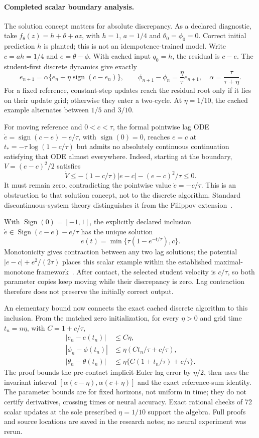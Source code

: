 \documentclass[11pt,a4paper]{article}
\begin{document}
\paragraph{Completed scalar boundary analysis.}
The solution concept matters for absolute discrepancy. As a declared
diagnostic, take $f_\theta(z)=h+\theta+az$, with $h=1$, $a=1/4$ and
$\theta_0=\phi_0=0$. Correct initial prediction $h$ is planted; this
is not an idempotence-trained model. Write $c=ah=1/4$ and
$e=\theta-\phi$. With cached input $q_0=h$, the residual is $c-e$.
The student-first discrete dynamics give exactly
\[
 e_{n+1}=\alpha\{e_n+\eta\operatorname{sign}(c-e_n)\},\qquad
 \phi_{n+1}-\phi_n=\frac{\eta}{\tau}e_{n+1},\quad
 \alpha=\frac{\tau}{\tau+\eta}.
\]
For a fixed reference, constant-step updates reach the residual root
only if it lies on their update grid; otherwise they enter a two-cycle.
At $\eta=1/10$, the cached example alternates between $1/5$ and $3/10$.

For moving reference and $0<c<\tau$, the formal pointwise lag ODE
$\dot e=\operatorname{sign}(c-e)-e/\tau$, with
$\operatorname{sign}(0)=0$, reaches $e=c$ at
$t_*=-\tau\log(1-c/\tau)$ but admits no absolutely continuous
continuation satisfying that ODE almost everywhere. Indeed, starting
at the boundary, $V=(e-c)^2/2$ satisfies
\[
 \dot V\le -(1-c/\tau)|e-c|-(e-c)^2/\tau\le0.
\]
It must remain zero, contradicting the pointwise value $\dot e=-c/\tau$.
This is an obstruction to that solution concept, not to the discrete
algorithm. Standard discontinuous-system theory distinguishes it from
the Filippov extension~\cite{cortes}.

With $\operatorname{Sign}(0)=[-1,1]$, the explicitly declared inclusion
$\dot e\in\operatorname{Sign}(c-e)-e/\tau$ has the unique solution
\[
 e(t)=\min\{\tau(1-e^{-t/\tau}),c\}.
\]
Monotonicity gives contraction between any two lag solutions; the
potential $|e-c|+e^2/(2\tau)$ places this scalar example within the
established maximal-monotone framework~\cite{benilanbrezis}.
After contact, the selected student velocity is $c/\tau$, so both
parameter copies keep moving while their discrepancy is zero.
Lag contraction therefore does not preserve the initially correct output.

An elementary bound now connects the exact cached discrete algorithm to
this inclusion. From the matched zero initialization, for every $\eta>0$
and grid time $t_n=n\eta$, with $C=1+c/\tau$,
\begin{align*}
 |e_n-e(t_n)|&\le C\eta,\\
 |\phi_n-\phi(t_n)|&\le\eta(Ct_n/\tau+c/\tau),\\
 |\theta_n-\theta(t_n)|&\le\eta\{C(1+t_n/\tau)+c/\tau\}.
\end{align*}
The proof bounds the pre-contact implicit-Euler lag error by $\eta/2$,
then uses the invariant interval
$[\alpha(c-\eta),\alpha(c+\eta)]$ and the exact reference-sum identity.
The parameter bounds are for fixed horizons, not uniform in time;
they do not certify derivatives, crossing times or neural accuracy.
Exact rational checks of 72 scalar updates at the sole prescribed
$\eta=1/10$ support the algebra. Full proofs and source locations are
saved in the research notes; no neural experiment was rerun.
\end{document}
